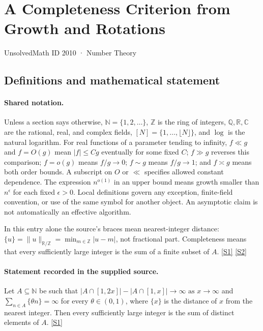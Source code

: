 \documentclass[11pt,a4paper]{article}
\newcommand{\N}{\mathbb{N}}
\newcommand{\Z}{\mathbb{Z}}
\newcommand{\Q}{\mathbb{Q}}
\newcommand{\R}{\mathbb{R}}
\newcommand{\C}{\mathbb{C}}
\newcommand{\sref}[2]{\hyperlink{source:#1:#2}{[S#2]}}
\begin{document}

\setcounter{section}{2009}

\section{A Completeness Criterion from Growth and Rotations}\label{2010}

{\small\sffamily UnsolvedMath ID 2010 · Number Theory}

\subsection{Definitions and mathematical statement}

\paragraph{Shared notation.}Unless a section says otherwise, $\N=\{1,2,\ldots\}$,
$\Z$ is the ring of integers, $\Q,\R,\C$ are the rational, real, and complex
fields, $[N]=\{1,\ldots,\lfloor N\rfloor\}$, and $\log$ is the natural
logarithm. For real functions of a parameter tending to infinity,
$f\ll g$ and $f=O(g)$ mean $|f|\leq Cg$ eventually for some fixed $C$;
$f\gg g$ reverses this comparison; $f=o(g)$ means $f/g\to0$;
$f\sim g$ means $f/g\to1$; and $f\asymp g$ means both order bounds.
A subscript on $O$ or $\ll$ specifies allowed constant dependence.
The expression $n^{o(1)}$ in an upper bound means growth smaller than
$n^\epsilon$ for each fixed $\epsilon>0$. Local definitions govern any
exception, finite-field convention, or use of the same symbol for another
object. An asymptotic claim is not automatically an effective algorithm.



In this entry alone the source's braces mean nearest-integer distance: $\{u\}=\|u\|_{\R/\Z}=\min_{m\in\Z}|u-m|$, not fractional part. Completeness means that every sufficiently large integer is the sum of a finite subset of $A$. \sref{2010}{1} \sref{2010}{2}

\paragraph{Statement recorded in the supplied source.}
Let $A\subseteq \mathbb{N}$ be such that $ \lvert A\cap [1,2x]\rvert -\lvert A\cap [1,x]\rvert \to \infty\textrm{ as }x\to \infty $ and $ \sum_{n\in A} \{ \theta n\}=\infty $ for every $\theta\in (0,1)$, where $\{x\}$ is the distance of $x$ from the nearest integer. Then every sufficiently large integer is the sum of distinct elements of $A$. \sref{2010}{1}
\end{document}
